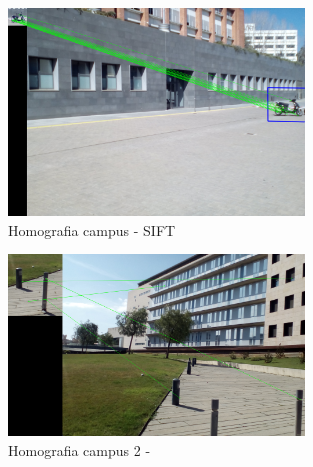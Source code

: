 		\begin{figure}[H]
			\centering
			\includegraphics[width=0.7\textwidth]{images/uniSel}
			\caption{Homografia campus - SIFT}
		\end{figure}
		\begin{figure}[H]
			\centering
			\includegraphics[width=0.7\textwidth]{images/uniSel2}
			\caption{Homografia campus 2 - }
		\end{figure}

